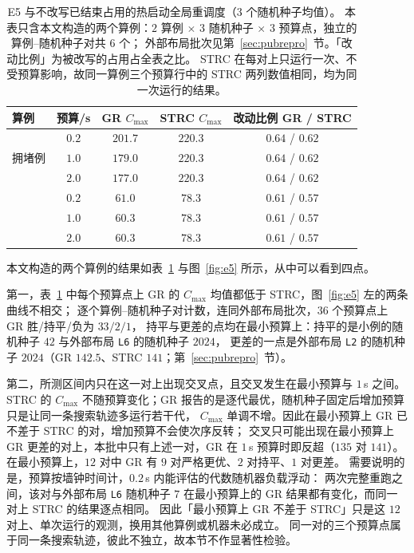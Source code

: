 \documentclass[manuscript,screen,review]{acmart}
\providecommand{\STRC}{\textsc{STRC}}
\newcommand{\EfiveCells}{12}        %
\newcommand{\EfivePts}{36}          %
\newcommand{\EfiveWLT}{33/2/1}      %
\newcommand{\EfiveWinMin}{9}       %
\newcommand{\EfiveTieMin}{2}  %
\begin{document}
\begin{table}[t]
\centering
\caption{E5 与不改写已结束占用的热启动全局重调度（\(3\) 个随机种子均值）。
本表只含本文构造的两个算例：\(2\) 算例 \(\times\) \(3\) 随机种子 \(\times\) \(3\) 预算点，独立的算例--随机种子对共 \(6\) 个；
外部布局批次见第~\ref{sec:pubrepro}~节。「改动比例」为被改写的占用占全表之比。
\STRC{} 在每对上只运行一次、不受预算影响，故同一算例三个预算行中的 \STRC{} 两列数值相同，均为同一次运行的结果。}
\label{tab:e5}
\small
\begin{tabular}{@{}lcccc@{}}
\toprule
算例 & 预算/s & GR \(C_{\max}\) & \STRC{} \(C_{\max}\) & 改动比例 GR / \STRC{} \\
\midrule
\multirow{3}{*}{拥堵例}
 & \(0.2\) & \(201.7\) & \(220.3\) & \(0.64\) / \(0.62\) \\
 & \(1.0\) & \(179.0\) & \(220.3\) & \(0.64\) / \(0.62\) \\
 & \(2.0\) & \(177.0\) & \(220.3\) & \(0.64\) / \(0.62\) \\
\addlinespace[2pt]
\multirow{3}{*}{小例}
 & \(0.2\) & \(61.0\)  & \(78.3\)  & \(0.61\) / \(0.57\) \\
 & \(1.0\) & \(60.3\)  & \(78.3\)  & \(0.61\) / \(0.57\) \\
 & \(2.0\) & \(60.3\)  & \(78.3\)  & \(0.61\) / \(0.57\) \\
\bottomrule
\end{tabular}
\end{table}

本文构造的两个算例的结果如表~\ref{tab:e5} 与图~\ref{fig:e5} 所示，从中可以看到四点。

第一，表~\ref{tab:e5} 中每个预算点上 GR 的 \(C_{\max}\) 均值都低于 \STRC{}，图~\ref{fig:e5} 左的两条曲线不相交；
逐个算例--随机种子对计数，连同外部布局批次，\(\EfivePts\) 个预算点上 GR 胜/持平/负为 \(\EfiveWLT\)，
持平与更差的点均在最小预算上：持平的是小例的随机种子 \(42\) 与外部布局 \texttt{L6} 的随机种子 \(2024\)，
更差的一点是外部布局 \texttt{L2} 的随机种子 \(2024\)（GR \(142.5\)、\STRC{} \(141\)；第~\ref{sec:pubrepro}~节）。

第二，所测区间内只在这一对上出现交叉点，且交叉发生在最小预算与 \(1\)\,s 之间。
\STRC{} 的 \(C_{\max}\) 不随预算变化；GR 报告的是逐代最优，随机种子固定后增加预算只是让同一条搜索轨迹多运行若干代，
\(C_{\max}\) 单调不增。因此在最小预算上 GR 已不差于 \STRC{} 的对，增加预算不会使次序反转；
交叉只可能出现在最小预算上 GR 更差的对上，本批中只有上述一对，GR 在 \(1\)\,s 预算时即反超（\(135\) 对 \(141\)）。
在最小预算上，\(\EfiveCells\) 对中 GR 有 \(\EfiveWinMin\) 对严格更优、\(\EfiveTieMin\) 对持平、\(1\) 对更差。
需要说明的是，预算按墙钟时间计，\(0.2\)\,s 内能评估的代数随机器负载浮动：
两次完整重跑之间，该对与外部布局 \texttt{L6} 随机种子 \(7\) 在最小预算上的 GR 结果都有变化，而同一对上 \STRC{} 的结果逐点相同。
因此「最小预算上 GR 不差于 \STRC{}」只是这 \(\EfiveCells\) 对上、单次运行的观测，换用其他算例或机器未必成立。
同一对的三个预算点属于同一条搜索轨迹，彼此不独立，故本节不作显著性检验。
\end{document}
